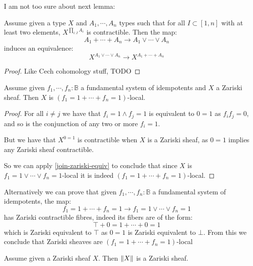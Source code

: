 I am not too sure about next lemma:

\begin{lemma}\label{join-zariski-equiv}
Assume given a type $X$ and $A_1,\cdots,A_n$ types such that for all $I\subset [1,n]$ with at least two elements, $X^{\prod_{i:I}A_i}$ is contractible. Then the map:
\[A_1+\cdots+A_n \to A_1\lor\cdots \lor A_n\]
induces an equivalence:
\[X^{A_1\lor\cdots\lor A_n} \to X^{A_1+\cdots+A_n}\]
\end{lemma}

\begin{proof}
Like Cech cohomology stuff, TODO
\end{proof}

\begin{lemma}\label{zariski-sum-local}
Assume given $f_1,\cdots,f_n:\mathbb{B}$ a fundamental system of idempotents and $X$ a Zariski sheaf. Then $X$ is $(f_1=1+\cdots + f_n=1)$-local.
\end{lemma}

\begin{proof}
For all $i\not=j$ we have that $f_i=1\land f_j = 1$ is equivalent to $0=1$ as $f_if_j=0$, and so is the conjunction of any two or more $f_i=1$. 

But we have that $X^{0=1}$ is contractible when $X$ is a Zariski sheaf, as $0=1$ implies any Zariski sheaf contractible.

So we can apply \cref{join-zariski-equiv} to conclude that since $X$ is $f_1=1\lor\cdots \lor f_n=1$-local it is indeed $(f_1=1+\cdots + f_n=1)$-local.
\end{proof}

\begin{remark}
Alternatively we can prove that given $f_1,\cdots,f_n:\mathbb{B}$ a fundamental system of idempotents, the map:
\[f_1=1+\cdots + f_n=1 \to f_1=1\lor\cdots\lor f_n=1\]
has Zariski contractible fibres, indeed its fibers are of the form:
\[\top + 0=1 + \cdots + 0=1\]
which is Zariski equivalent to $\top$ as $0=1$ is Zariski equivalent to $\bot$. From this we conclude that Zariski sheaves are $(f_1=1+\cdots + f_n=1)$-local
\end{remark}

\begin{lemma}\label{zariski-stable-truncation}
Assume given a Zariski sheaf $X$. Then $\lVert X \rVert$ is a Zariski sheaf.
\end{lemma}


